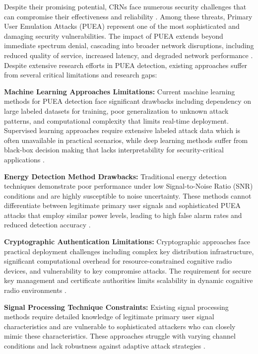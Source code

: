 \documentclass[pdflatex,sn-mathphys-num]{sn-jnl}%
\theoremstyle{thmstyleone}
\theoremstyle{thmstyletwo}
\theoremstyle{thmstylethree}
\begin{document}
Despite their promising potential, CRNs face numerous security challenges that can compromise their effectiveness and reliability \cite{ref25,ref7}. Among these threats, Primary User Emulation Attacks (PUEA) represent one of the most sophisticated and damaging security vulnerabilities. The impact of PUEA extends beyond immediate spectrum denial, cascading into broader network disruptions, including reduced quality of service, increased latency, and degraded network performance \cite{ref4,ref8}.\\


Despite extensive research efforts in PUEA detection, existing approaches suffer from several critical limitations and research gaps:

\textbf{Machine Learning Approaches Limitations:} Current machine learning methods for PUEA detection face significant drawbacks including dependency on large labeled datasets for training, poor generalization to unknown attack patterns, and computational complexity that limits real-time deployment. Supervised learning approaches require extensive labeled attack data which is often unavailable in practical scenarios, while deep learning methods suffer from black-box decision making that lacks interpretability for security-critical applications \cite{ref9,ref22}.

\textbf{Energy Detection Method Drawbacks:} Traditional energy detection techniques demonstrate poor performance under low Signal-to-Noise Ratio (SNR) conditions and are highly susceptible to noise uncertainty. These methods cannot differentiate between legitimate primary user signals and sophisticated PUEA attacks that employ similar power levels, leading to high false alarm rates and reduced detection accuracy \cite{ref1,ref11}.

\textbf{Cryptographic Authentication Limitations:} Cryptographic approaches face practical deployment challenges including complex key distribution infrastructure, significant computational overhead for resource-constrained cognitive radio devices, and vulnerability to key compromise attacks. The requirement for secure key management and certificate authorities limits scalability in dynamic cognitive radio environments \cite{ref5,ref6}.

\textbf{Signal Processing Technique Constraints:} Existing signal processing methods require detailed knowledge of legitimate primary user signal characteristics and are vulnerable to sophisticated attackers who can closely mimic these characteristics. These approaches struggle with varying channel conditions and lack robustness against adaptive attack strategies \cite{ref4,ref17}.
\end{document}
